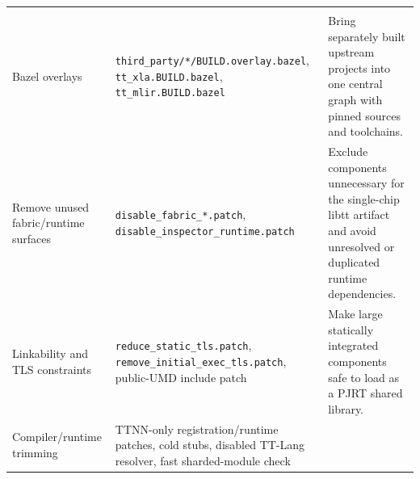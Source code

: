 \documentclass[
  10pt,
  american,
  10pt,
  letterpaper]{article}
\begin{document}
\begin{longtable}[]{@{}lll@{}}
\begin{minipage}[t]{0.30\columnwidth}
\end{minipage}\tabularnewline
\begin{minipage}[t]{0.30\columnwidth}\raggedright
Bazel overlays\strut
\end{minipage} & \begin{minipage}[t]{0.30\columnwidth}\raggedright
\texttt{third\_party/*/BUILD.overlay.bazel},
\texttt{tt\_xla.BUILD.bazel}, \texttt{tt\_mlir.BUILD.bazel}\strut
\end{minipage} & \begin{minipage}[t]{0.30\columnwidth}\raggedright
Bring separately built upstream projects into one central graph with
pinned sources and toolchains.\strut
\end{minipage}\tabularnewline
\begin{minipage}[t]{0.30\columnwidth}\raggedright
Remove unused fabric/runtime surfaces\strut
\end{minipage} & \begin{minipage}[t]{0.30\columnwidth}\raggedright
\texttt{disable\_fabric\_*.patch},
\texttt{disable\_inspector\_runtime.patch}\strut
\end{minipage} & \begin{minipage}[t]{0.30\columnwidth}\raggedright
Exclude components unnecessary for the single-chip libtt artifact and
avoid unresolved or duplicated runtime dependencies.\strut
\end{minipage}\tabularnewline
\begin{minipage}[t]{0.30\columnwidth}\raggedright
Linkability and TLS constraints\strut
\end{minipage} & \begin{minipage}[t]{0.30\columnwidth}\raggedright
\texttt{reduce\_static\_tls.patch},
\texttt{remove\_initial\_exec\_tls.patch}, public-UMD include
patch\strut
\end{minipage} & \begin{minipage}[t]{0.30\columnwidth}\raggedright
Make large statically integrated components safe to load as a PJRT
shared library.\strut
\end{minipage}\tabularnewline
\begin{minipage}[t]{0.30\columnwidth}\raggedright
Compiler/runtime trimming\strut
\end{minipage} & \begin{minipage}[t]{0.30\columnwidth}\raggedright
TTNN-only registration/runtime patches, cold stubs, disabled TT-Lang
resolver, fast sharded-module check\strut
\end{minipage} & \begin{minipage}[t]{0.30\columnwidth}\raggedright

\end{minipage}
\end{longtable}
\end{document}
